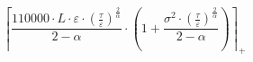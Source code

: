 \[\left\lceil \frac{110000 \cdot L \cdot \varepsilon \cdot \left(\frac{\tau}{\varepsilon}\right)^{\frac{2}{\alpha}}}{2 - \alpha} \cdot \left(1 + \frac{\sigma^{2} \cdot \left(\frac{\tau}{\varepsilon}\right)^{\frac{2}{\alpha}}}{2 - \alpha}\right) \right\rceil_{+}\]
